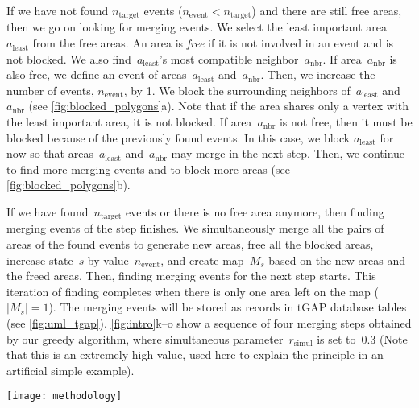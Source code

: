 \documentclass[twocolumn]{svjour3}          %
\begin{document}
If we have not found $n_\mathrm{target}$ events 
($n_\mathrm{event} < n_\mathrm{target}$)
and there are still free areas,
then we go on looking for merging events.
We select the least important area~$a_\mathrm{least}$
from the free areas.
An area is \emph{free} if 
it is not involved in an event and is not blocked.
We also find~$a_\mathrm{least}$'s 
most compatible neighbor~$a_\mathrm{nbr}$.
If area~$a_\mathrm{nbr}$ is also free, 
we define an event of areas~$a_\mathrm{least}$ and~$a_\mathrm{nbr}$.
Then, we increase the number of events, $n_\mathrm{event}$, by 1.
We block the surrounding neighbors of~$a_\mathrm{least}$ and~$a_\mathrm{nbr}$
(see \fig\ref{fig:blocked_polygons}a).
Note that if the area shares only a vertex 
with the least important area, it is not blocked.
If area~$a_\mathrm{nbr}$ is not free,
then it must be blocked because of the previously found events.
In this case, we block $a_\mathrm{least}$ for now
so that areas~$a_\mathrm{least}$ and~$a_\mathrm{nbr}$ 
may merge in the next step.
Then, we continue to find more merging events and to block more areas
(see \fig\ref{fig:blocked_polygons}b).

If we have found~$n_\mathrm{target}$ events 
or there is no free area anymore,
then finding merging events of the step finishes.
We simultaneously merge all the pairs of areas of the found events
to generate new areas,
free all the blocked areas,
increase state~$s$ by value~$n_\mathrm{event}$,
and create map~$M_s$ based on the new areas and the freed areas.
Then, finding merging events for the next step starts.
This iteration of finding completes 
when there is only one area left on the map ($|M_s|=1$).
The merging events will be stored as records in tGAP database tables
(see \fig\ref{fig:uml_tgap}).
\figs\ref{fig:intro}k--o show a sequence of four merging steps
obtained by our greedy algorithm,
where simultaneous parameter~$r_\mathrm{simul}$ is set to~$0.3$
(Note that this is an extremely high value, 
used here to explain the principle in an artificial simple example).



\begin{figure*}[tb]
\centering
\texttt{[image: methodology]}
\caption{The Unified Modeling Language (UML) diagram of the classes 
stored in tGAP database tables.
This diagram is a slightly improved version of \citet[]{Meijers2011Thesis}.
In the face table, property \emph{pip\_geometry} 
stores a point (usually the center) in the face (polygon).
The geometry of a face can be obtained by calling function \emph{getGeometry()}.
We do not store the face geometry because we want to avoid redundancy,
as the edges already stores the sequences of points.
}
\label{fig:uml_tgap}
\end{figure*}
\end{document}
